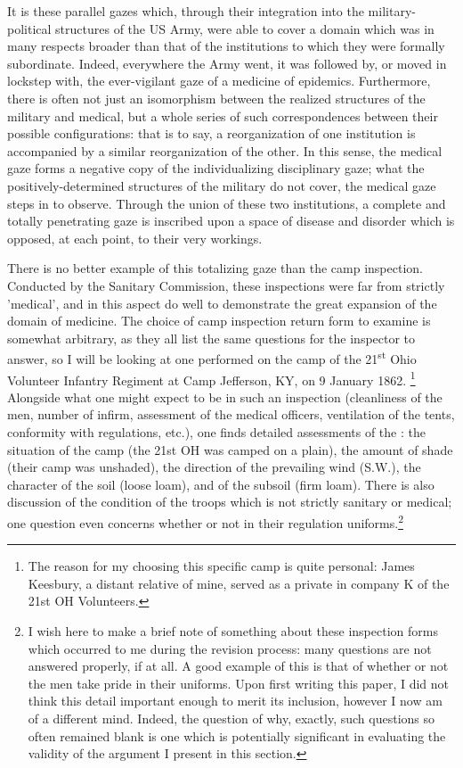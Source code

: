 \documentclass[12pt]{article}
\begin{document}
It is these parallel gazes which, through their integration into the military-political structures of the US Army, were able to cover a
domain which was in many respects broader than that of the institutions to which they were formally subordinate. Indeed, everywhere the Army
went, it was followed by, or moved in lockstep with, the ever-vigilant gaze of a medicine of epidemics. Furthermore, there is often not just an isomorphism
between the realized structures of the military and medical, but a whole series of such correspondences between their possible configurations: that is to say, a
reorganization of one institution is accompanied by a similar reorganization of the other. In this sense, the medical gaze forms a negative
copy of the individualizing disciplinary gaze; what the positively-determined structures of the military do not cover, the medical gaze steps in to observe.
Through the union of these two institutions, a complete and totally penetrating gaze is inscribed upon a space of disease and disorder which is opposed, at
each point, to their very workings.

There is no better example of this totalizing gaze than the camp inspection. Conducted by the Sanitary Commission, these inspections were far from
strictly 'medical', and in this aspect do well to demonstrate the great expansion of the domain of medicine. The choice
of camp inspection return form to examine is somewhat arbitrary, as they all list the same questions for the inspector to answer, so I will be looking
at one performed on the camp of the 21\textsuperscript{st} Ohio Volunteer Infantry Regiment at Camp Jefferson, KY, on 9 January 1862.\autocite{ussc:20:699}
\footnote{The reason for my choosing this specific camp is quite personal: James Keesbury, a distant relative of mine, served as a
	private in company K of the 21st OH Volunteers.} Alongside what one might expect to be in such an inspection (cleanliness of the men, number of
infirm, assessment of the medical officers, ventilation of the tents, conformity with regulations, etc.), one finds detailed assessments of
the : the situation of the camp (the 21st OH was camped on a plain), the amount of shade (their camp was unshaded),
the direction of the prevailing wind (S.W.), the character of the soil (loose loam), and of the subsoil (firm loam). There is also discussion of the
condition of the troops which is not strictly sanitary or medical; one question even concerns whether or not  in their regulation
uniforms.\footnote{I wish here to make a brief note of something about these inspection forms which occurred to me during the revision process: many questions are not answered properly,
	if at all. A good example of this is that of whether or not the men take pride in their uniforms. Upon first writing this paper, I did not think this
	detail important enough to merit its inclusion, however I now am of a different mind. Indeed, the question of why, exactly, such questions so often remained
	blank is one which is potentially significant in evaluating the validity of the argument I present in this section.}
\end{document}

